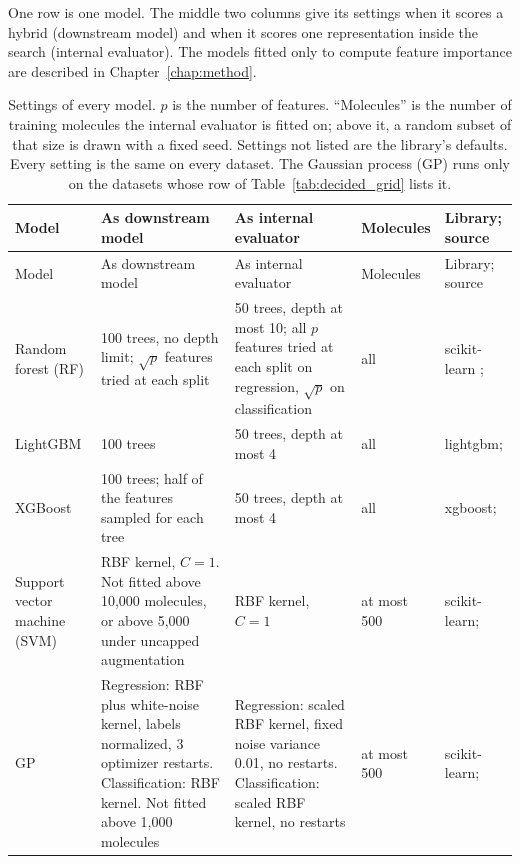 \label{app:add:model_settings}
One row is one model. The middle two columns give its settings when it scores a hybrid (downstream model) and when it scores one representation inside the search (internal evaluator). The models fitted only to compute feature importance are described in Chapter~\ref{chap:method}.

{\small
\begin{longtable}{@{}P{1.9cm}P{4.0cm}P{3.5cm}P{1.6cm}P{2.3cm}@{}}
\caption{Settings of every model. $p$ is the number of features. ``Molecules'' is the number of training molecules the internal evaluator is fitted on; above it, a random subset of that size is drawn with a fixed seed. Settings not listed are the library's defaults. Every setting is the same on every dataset. The Gaussian process (GP) runs only on the datasets whose row of Table~\ref{tab:decided_grid} lists it.}
\label{tab:add:model_settings}\\
\toprule
Model & As downstream model & As internal evaluator & Molecules & Library; source \\
\midrule
\endfirsthead
\toprule
Model & As downstream model & As internal evaluator & Molecules & Library; source \\
\midrule
\endhead
Random forest (RF) & 100 trees, no depth limit; $\sqrt{p}$ features tried at each split & 50 trees, depth at most 10; all $p$ features tried at each split on regression, $\sqrt{p}$ on classification & all & scikit-learn \citep{scikit-learn}; \citet{Breiman2001} \\
\addlinespace
LightGBM & 100 trees & 50 trees, depth at most 4 & all & lightgbm; \citet{ke2017lightgbm} \\
\addlinespace
XGBoost & 100 trees; half of the features sampled for each tree & 50 trees, depth at most 4 & all & xgboost; \citet{Chen2016} \\
\addlinespace
Support vector machine (SVM) & RBF kernel, $C = 1$. Not fitted above 10{,}000 molecules, or above 5{,}000 under uncapped augmentation & RBF kernel, $C = 1$ & at most 500 & scikit-learn; \citet{Vapnik1995} \\
\addlinespace
GP & Regression: RBF plus white-noise kernel, labels normalized, 3 optimizer restarts. Classification: RBF kernel. Not fitted above 1{,}000 molecules & Regression: scaled RBF kernel, fixed noise variance 0.01, no restarts. Classification: scaled RBF kernel, no restarts & at most 500 & scikit-learn; \citet{Rasmussen2005} \\

\end{longtable}}
